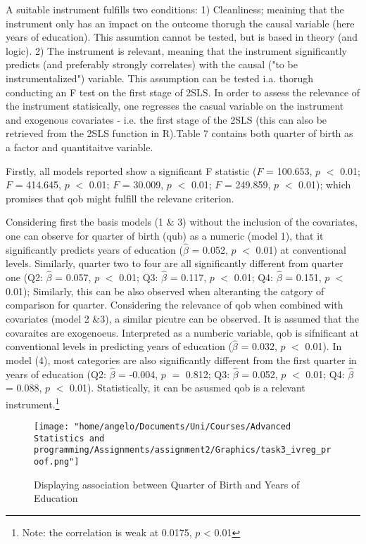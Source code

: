 \documentclass[a4paper]{article}
\begin{document}
A suitable instrument fulfills two conditions: 1) Cleanliness; meaining that the instrument only has an impact on the outcome thorugh the causal variable (here years of education). This assumtion cannot be tested, but is based in theory (and logic).
2) The instrument is relevant, meaning that the instrument significantly predicts (and preferably strongly correlates) with the causal ("to be instrumentalized") variable. This assumption can be tested i.a. thorugh conducting an F test on the first stage of 2SLS. 
In order to assess the relevance of the instrument statisically, one regresses the casual variable on the instrument and exogenous covariates - i.e. the first stage of the 2SLS (this can also be retrieved from the 2SLS function in R).Table 7 contains both quarter of birth as a factor and quantitaitve variable. 

Firstly, all models reported show a significant F statistic ($F$ = 100.653, $p$ $<$ 0.01; $F$ = 414.645, $p$ $<$ 0.01; $F$ = 30.009, $p$ $<$ 0.01; $F$ = 249.859, $p$ $<$ 0.01); which promises that qob might fulfill the relevane criterion.

Considering first the basis models (1 \& 3) without the inclusion of the covariates, one can observe for quarter of birth (qub) as a numeric (model 1), that it significantly predicts years of education ($\hat{\beta}$ = 0.052, $p$ $<$ 0.01) at conventional levels. Similarly, quarter two to four are all significantly different from quarter one (Q2: $\hat{\beta}$ = 0.057, $p$ $<$ 0.01; Q3: $\hat{\beta}$ = 0.117, $p$ $<$ 0.01; Q4: $\hat{\beta}$ = 0.151, $p$ $<$ 0.01); Similarly, this can be also  observed when alteranting the catgory of comparison for quarter. 
Considering the relevance of qob when combined with covariates (model 2 \&3), a similar picutre can be observed. It is assumed that the covaraites are exogenoeus. Interpreted as a numberic variable, qob is sifnificant at conventional levels in predicting years of education ($\hat{\beta}$ = 0.032, $p$ $<$ 0.01). In model (4), most categories are also significantly different from the first quarter in years of education (Q2: $\hat{\beta}$ = -0.004, $p$ $=$ 0.812; Q3: $\hat{\beta}$ = 0.052, $p$ $<$ 0.01; Q4: $\hat{\beta}$ = 0.088, $p$ $<$ 0.01). Statistically, it can be asusmed qob is a relevant instrument.\footnote{Note: the correlation is weak at 0.0175, $p$ < 0.01}

\begin{figure}[htp]
		\centering
         \texttt{[image: "home/angelo/Documents/Uni/Courses/Advanced Statistics and programming/Assignments/assignment2/Graphics/task3\_ivreg\_proof.png"]}
         \small
         \caption{Displaying association between Quarter of Birth and Years of Education}
\end{figure}
\end{document}
